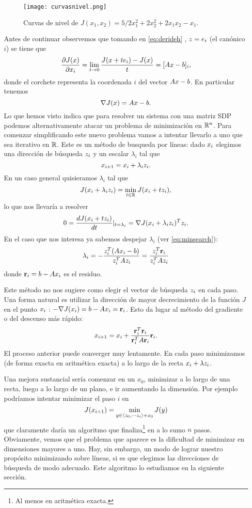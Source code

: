 \begin{figure}[h]
\centering\texttt{[image: curvasnivel.png]}
\label{fig:curvasdeJ}
\caption{Curvas de nivel de $
J(x_1,x_2)=5/2x_1^2+2x_2^2+2x_1x_2-x_1
$.}
\end{figure}
\tcc
Antes de continuar observemos que tomando en \eqref{eq:derideh} , $\zb=\eb_i$ (el canónico $i$) se tiene que
$$\frac{\partial J(\xb)}{\partial x_i}=\lim_{t\to 0} \frac{J(\xb+t\eb_i)-J(\xb)}{t}=[\Ab\xb-\bb]_i,$$
donde el corchete representa la coordenada $i$ del vector $\Ab\xb-\bb$. En particular tenemos
$$
\nabla J(\xb)=\Ab\xb-\bb.
$$
\etcc
Lo que hemos visto indica que para resolver un sistema con una matriz SDP podemos alternativamente atacar un problema de minimización en $\mathbb R^{n}$. Para comenzar simplificando este nuevo problema vamos a intentar llevarlo a uno que sea iterativo en $\mathbb R$. Este es un m\'etodo de busqueda por líneas: dado $\xb_i$ elegimos una dirección de búsqueda $\zb_i$ y un escalar $\lambda_i$ tal que
$$
\xb_{i+1}=\xb_i+\lambda_i\zb_i.
$$
En un caso general quisieramos $\lambda_i$ tal que
$$
J(\xb_{i}+\lambda_i\zb_i )=\min_{t\in \R}J(\xb_i+t\zb_i),
$$
lo que nos llevaría a resolver
$$
0=\frac{dJ(\xb_{i}+t\zb_i )}{dt}|_{t=\lambda_i}=\nabla J(\xb_{i}+\lambda_i\zb_i )^T\zb_i.
$$
En el caso que nos interesa ya sabemos despejar $\lambda_i$ (ver \eqref{eq:minsearch}):
$$
\lambda_i=-\frac{\zb_i^T(\Ab\xb_i-\bb)}{\zb_i^T\Ab\zb_i}=
\frac{\zb_i^T\rb_i}{\zb_i^T\Ab\zb_i}
$$
donde $\rb_i=\bb-\Ab\xb_i$ es el residuo.

Este método no nos sugiere como elegir el vector de búsqueda $\zb_i$ en cada paso. Una forma natural es utilizar la dirección de mayor decrecimiento de la función $J$ en el punto $\xb_i$ : $-\nabla J(\xb_i)=\bb-\Ab\xb_i=\rb_i$. Esto da lugar al método del gradiente o del descenso más rápido:
$$
\xb_{i+1}=\xb_i+\frac{\rb_i^T\rb_i}{\rb_i^T\Ab\rb_i}
\rb_i.
$$
El proceso anterior puede converger muy lentamente. En cada paso minimizamos (de forma exacta en aritmética exacta) a lo largo de la recta $\xb_i+\lambda \zb_i$. 

Una mejora sustancial sería comenzar en un $x_0$, minimizar a lo largo de una recta, luego a lo largo de un plano, e ir aumentando la dimensión. Por ejemplo podríamos  intentar minimizar el paso $i$ en 
$$
J(\xb_{i+1})=\min_{\yb\in \langle \zb_0,\cdots\zb_i \rangle + x_0}J(\yb)
$$
que claramente daría un algoritmo que finaliza\footnote{Al menos en aritmética exacta.} en a lo sumo $n$ pasos. Obviamente, vemos que el problema que aparece es la dificultad de minimizar en dimensiones mayores a uno. Hay, sin embargo, un modo de lograr nuestro propósito minimizando sobre líneas, si es que elegimos las direcciones de búsqueda de modo adecuado. Este algoritmo lo estudiamos en la siguiente sección.
